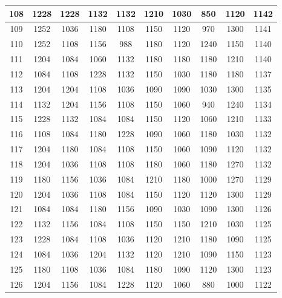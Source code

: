 \documentclass{article}
\begin{document}
\begin{table}
\begin{tabular}{c|c|c|c|c|c|c|c|c|c|}
\multicolumn{1}{|c|}{108} & 1228 & 1228 & 1132 & 1132 & 1210 & 1030 & 850  & 1120 & 1142 \\ \hline
\multicolumn{1}{|c|}{109} & 1252 & 1036 & 1180 & 1108 & 1150 & 1120 & 970  & 1300 & 1141 \\ \hline
\multicolumn{1}{|c|}{110} & 1252 & 1108 & 1156 & 988  & 1180 & 1120 & 1240 & 1150 & 1140 \\ \hline
\multicolumn{1}{|c|}{111} & 1204 & 1084 & 1060 & 1132 & 1180 & 1180 & 1180 & 1210 & 1140 \\ \hline
\multicolumn{1}{|c|}{112} & 1084 & 1108 & 1228 & 1132 & 1150 & 1030 & 1180 & 1180 & 1137 \\ \hline
\multicolumn{1}{|c|}{113} & 1204 & 1204 & 1108 & 1036 & 1090 & 1090 & 1030 & 1300 & 1135 \\ \hline
\multicolumn{1}{|c|}{114} & 1132 & 1204 & 1156 & 1108 & 1150 & 1060 & 940  & 1240 & 1134 \\ \hline
\multicolumn{1}{|c|}{115} & 1228 & 1132 & 1084 & 1084 & 1150 & 1120 & 1060 & 1210 & 1133 \\ \hline
\multicolumn{1}{|c|}{116} & 1108 & 1084 & 1180 & 1228 & 1090 & 1060 & 1180 & 1030 & 1132 \\ \hline
\multicolumn{1}{|c|}{117} & 1204 & 1180 & 1084 & 1108 & 1150 & 1060 & 1090 & 1120 & 1132 \\ \hline
\multicolumn{1}{|c|}{118} & 1204 & 1036 & 1108 & 1108 & 1180 & 1060 & 1180 & 1270 & 1132 \\ \hline
\multicolumn{1}{|c|}{119} & 1180 & 1156 & 1036 & 1084 & 1210 & 1180 & 1000 & 1270 & 1129 \\ \hline
\multicolumn{1}{|c|}{120} & 1204 & 1036 & 1108 & 1084 & 1150 & 1120 & 1120 & 1300 & 1129 \\ \hline
\multicolumn{1}{|c|}{121} & 1084 & 1084 & 1180 & 1156 & 1090 & 1030 & 1090 & 1300 & 1126 \\ \hline
\multicolumn{1}{|c|}{122} & 1132 & 1156 & 1084 & 1108 & 1150 & 1150 & 1210 & 1030 & 1125 \\ \hline
\multicolumn{1}{|c|}{123} & 1228 & 1084 & 1108 & 1036 & 1120 & 1210 & 1180 & 1090 & 1125 \\ \hline
\multicolumn{1}{|c|}{124} & 1084 & 1036 & 1204 & 1132 & 1120 & 1210 & 1090 & 1150 & 1123 \\ \hline
\multicolumn{1}{|c|}{125} & 1180 & 1108 & 1036 & 1084 & 1180 & 1090 & 1120 & 1300 & 1123 \\ \hline
\multicolumn{1}{|c|}{126} & 1204 & 1156 & 1084 & 1228 & 1120 & 1060 & 880  & 1000 & 1122 \\ \hline

\end{tabular}
\end{table}
\end{document}

